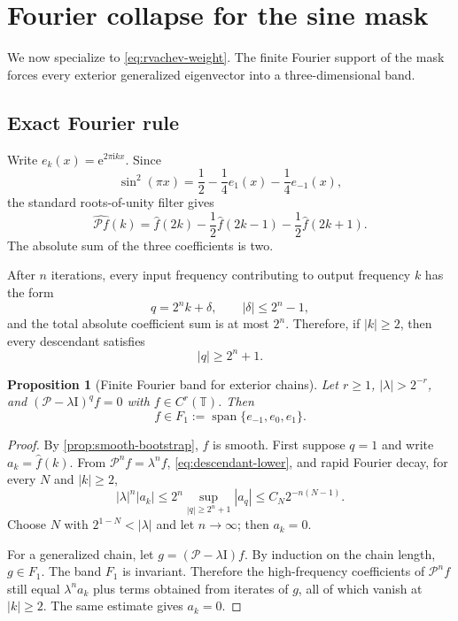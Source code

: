 \documentclass[11pt,a4paper]{article}
\newtheorem{proposition}[theorem]{Proposition}
\theoremstyle{definition}
\theoremstyle{remark}
\newcommand{\T}{\mathbb T}
\newcommand{\Span}{\operatorname{span}}
\newcommand{\e}{\mathrm e}
\newcommand{\ii}{\mathrm i}
\newcommand{\Pop}{\mathcal P}
\newcommand{\id}{\mathrm I}
\newcommand{\Fourier}[1]{\widehat{#1}}
\begin{document}
\section{Fourier collapse for the sine mask}
\label{sec:fourier-collapse}

We now specialize to \eqref{eq:rvachev-weight}.  The finite Fourier support
of the mask forces every exterior generalized eigenvector into a
three-dimensional band.

\subsection{Exact Fourier rule}
Write $e_k(x)=\e^{2\pi\ii kx}$.  Since
\begin{equation}
 \sin^2(\pi x)=\frac12-\frac14e_1(x)-\frac14e_{-1}(x),
 \label{eq:sine-fourier}
\end{equation}
the standard roots-of-unity filter gives
\begin{equation}
 \Fourier{\Pop f}(k)
 =\Fourier f(2k)-\frac12\Fourier f(2k-1)
 -\frac12\Fourier f(2k+1).
 \label{eq:P-fourier-rule}
\end{equation}
The absolute sum of the three coefficients is two.

After $n$ iterations, every input frequency contributing to output frequency
$k$ has the form
\begin{equation}
 q=2^nk+\delta,
 \qquad |\delta|\le2^n-1,
 \label{eq:descendant-frequency}
\end{equation}
and the total absolute coefficient sum is at most $2^n$.  Therefore, if
$|k|\ge2$, then every descendant satisfies
\begin{equation}
 |q|\ge2^n+1.
 \label{eq:descendant-lower}
\end{equation}

\begin{proposition}[Finite Fourier band for exterior chains]
\label{prop:finite-band}
Let $r\ge1$, $|\lambda|>2^{-r}$, and
$(\Pop-\lambda\id)^qf=0$ with $f\in C^r(\T)$.  Then
\begin{equation}
 f\in F_1:=\Span\{e_{-1},e_0,e_1\}.
 \label{eq:F1}
\end{equation}
\end{proposition}
\begin{proof}
By \cref{prop:smooth-bootstrap}, $f$ is smooth.  First suppose $q=1$ and
write $a_k=\Fourier f(k)$.  From $\Pop^nf=\lambda^nf$,
\eqref{eq:descendant-lower}, and rapid Fourier decay, for every $N$ and
$|k|\ge2$,
\[
 |\lambda|^n|a_k|
 \le 2^n\sup_{|q|\ge2^n+1}|a_q|
 \le C_N2^{-n(N-1)}.
\]
Choose $N$ with $2^{1-N}<|\lambda|$ and let $n\to\infty$; then $a_k=0$.

For a generalized chain, let
$g=(\Pop-\lambda\id)f$.  By induction on the chain length, $g\in F_1$.
The band $F_1$ is invariant.  Therefore the high-frequency coefficients of
$\Pop^nf$ still equal $\lambda^na_k$ plus terms obtained from iterates of
$g$, all of which vanish at $|k|\ge2$.  The same estimate gives $a_k=0$.
\end{proof}
\end{document}
